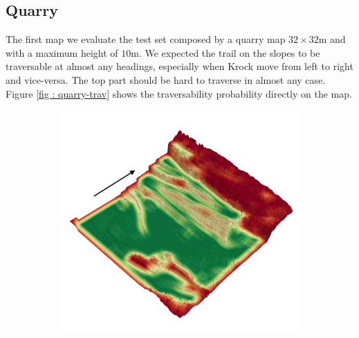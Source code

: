 \documentclass[../document.tex]{subfiles}
\begin{document}
\subsection{Quarry}
The first map we evaluate the test set composed by a quarry map  $32\times32$m  and with a maximum height of $10$m. We expected the trail on the slopes to be traversable at almost any headings, especially when Krock move from left to right and vice-versa. The top part should be hard to traverse in almost any case. Figure \ref{fig : quarry-trav} shows the traversability probability directly on the map. 
\begin{figure} [htbp]
\centering
\begin{subfigure}[b]{0.45\textwidth}
  \includegraphics[width=\linewidth]{../img/4/traversability/quarry/-270.png} 
\end{subfigure}
\begin{subfigure}[b]{0.45\textwidth}

\end{subfigure}
\end{figure}
\end{document}
